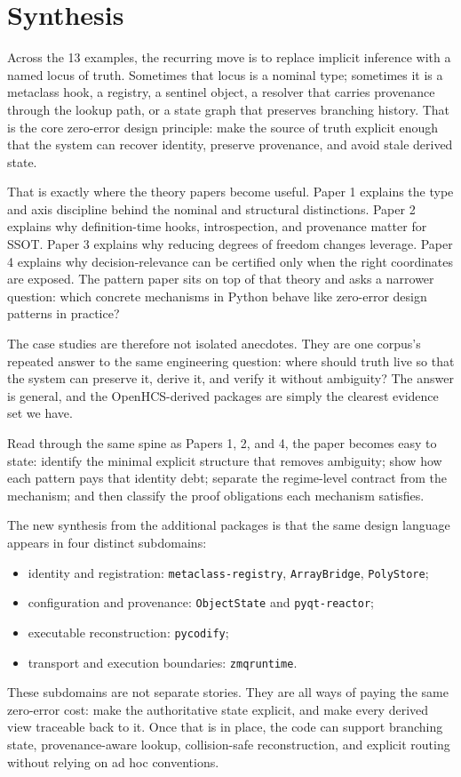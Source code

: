 \section{Synthesis}

Across the 13 examples, the recurring move is to replace implicit inference with a named locus of truth. Sometimes that locus is a nominal type; sometimes it is a metaclass hook, a registry, a sentinel object, a resolver that carries provenance through the lookup path, or a state graph that preserves branching history. That is the core zero-error design principle: make the source of truth explicit enough that the system can recover identity, preserve provenance, and avoid stale derived state.

That is exactly where the theory papers become useful. Paper 1 explains the type and axis discipline behind the nominal and structural distinctions. Paper 2 explains why definition-time hooks, introspection, and provenance matter for SSOT. Paper 3 explains why reducing degrees of freedom changes leverage. Paper 4 explains why decision-relevance can be certified only when the right coordinates are exposed. The pattern paper sits on top of that theory and asks a narrower question: which concrete mechanisms in Python behave like zero-error design patterns in practice?

The case studies are therefore not isolated anecdotes. They are one corpus's repeated answer to the same engineering question: where should truth live so that the system can preserve it, derive it, and verify it without ambiguity? The answer is general, and the OpenHCS-derived packages are simply the clearest evidence set we have.

Read through the same spine as Papers 1, 2, and 4, the paper becomes easy to state: identify the minimal explicit structure that removes ambiguity; show how each pattern pays that identity debt; separate the regime-level contract from the mechanism; and then classify the proof obligations each mechanism satisfies.

The new synthesis from the additional packages is that the same design language appears in four distinct subdomains:

\begin{itemize}[leftmargin=1.25em]
\item identity and registration: \texttt{metaclass-registry}, \texttt{ArrayBridge}, \texttt{PolyStore};
\item configuration and provenance: \texttt{ObjectState} and \texttt{pyqt-reactor};
\item executable reconstruction: \texttt{pycodify};
\item transport and execution boundaries: \texttt{zmqruntime}.
\end{itemize}

These subdomains are not separate stories. They are all ways of paying the same zero-error cost: make the authoritative state explicit, and make every derived view traceable back to it. Once that is in place, the code can support branching state, provenance-aware lookup, collision-safe reconstruction, and explicit routing without relying on ad hoc conventions.
